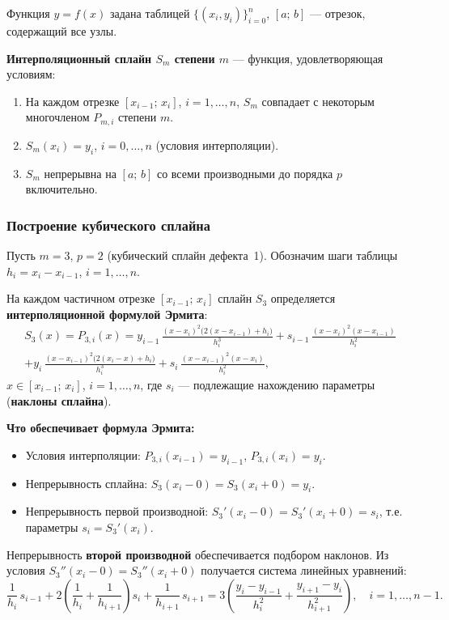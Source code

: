 Функция $y = f(x)$ задана таблицей $\{(x_i, y_i)\}_{i=0}^{n}$, $[a;\,b]$ --- отрезок, содержащий все узлы.

\textbf{Интерполяционный сплайн $S_m$ степени $m$} --- функция, удовлетворяющая условиям:
\begin{enumerate}
    \item На каждом отрезке $[x_{i-1};\, x_i]$, $i = 1, \ldots, n$, $S_m$ совпадает с некоторым многочленом $P_{m,i}$ степени $m$.
    \item $S_m(x_i) = y_i$, $i = 0, \ldots, n$ (условия интерполяции).
    \item $S_m$ непрерывна на $[a;\,b]$ со всеми производными до порядка $p$ включительно.
\end{enumerate}

\subsubsection*{Построение кубического сплайна}

Пусть $m = 3$, $p = 2$ (кубический сплайн дефекта~1). Обозначим шаги таблицы $h_i = x_i - x_{i-1}$, $i = 1, \ldots, n$.

На каждом частичном отрезке $[x_{i-1};\, x_i]$ сплайн $S_3$ определяется \textbf{интерполяционной формулой Эрмита}:
\begin{multline*}
    S_3(x) = P_{3,i}(x) = y_{i-1}\,\frac{(x - x_i)^2\bigl(2(x - x_{i-1}) + h_i\bigr)}{h_i^3} + s_{i-1}\,\frac{(x - x_i)^2(x - x_{i-1})}{h_i^2} \\
    + y_i\,\frac{(x - x_{i-1})^2\bigl(2(x_i - x) + h_i\bigr)}{h_i^3} + s_i\,\frac{(x - x_{i-1})^2(x - x_i)}{h_i^2},
\end{multline*}
$x \in [x_{i-1};\, x_i]$, $i = 1, \ldots, n$, где $s_i$ --- подлежащие нахождению параметры (\textbf{наклоны сплайна}).

\textbf{Что обеспечивает формула Эрмита:}
\begin{itemize}
    \item Условия интерполяции: $P_{3,i}(x_{i-1}) = y_{i-1}$, $P_{3,i}(x_i) = y_i$.
    \item Непрерывность сплайна: $S_3(x_i - 0) = S_3(x_i + 0) = y_i$.
    \item Непрерывность первой производной: $S_3'(x_i - 0) = S_3'(x_i + 0) = s_i$, т.е. параметры $s_i = S_3'(x_i)$.
\end{itemize}

Непрерывность \textbf{второй производной} обеспечивается подбором наклонов. Из условия $S_3''(x_i - 0) = S_3''(x_i + 0)$ получается система линейных уравнений:
\[
    \frac{1}{h_i}\,s_{i-1} + 2\left(\frac{1}{h_i} + \frac{1}{h_{i+1}}\right)s_i + \frac{1}{h_{i+1}}\,s_{i+1} = 3\left(\frac{y_i - y_{i-1}}{h_i^2} + \frac{y_{i+1} - y_i}{h_{i+1}^2}\right), \quad i = 1, \ldots, n-1.
\]

